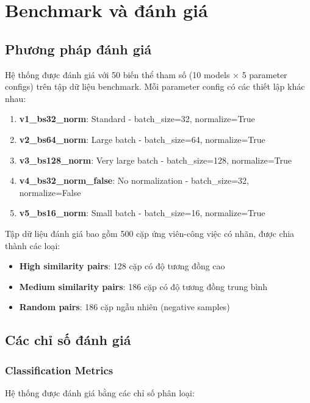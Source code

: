 \section{Benchmark và đánh giá}

\subsection{Phương pháp đánh giá}

Hệ thống được đánh giá với 50 biến thể tham số (10 models × 5 parameter configs) trên tập dữ liệu benchmark. Mỗi parameter config có các thiết lập khác nhau:

\begin{enumerate}
    \item \textbf{v1\_bs32\_norm}: Standard - batch\_size=32, normalize=True
    \item \textbf{v2\_bs64\_norm}: Large batch - batch\_size=64, normalize=True
    \item \textbf{v3\_bs128\_norm}: Very large batch - batch\_size=128, normalize=True
    \item \textbf{v4\_bs32\_norm\_false}: No normalization - batch\_size=32, normalize=False
    \item \textbf{v5\_bs16\_norm}: Small batch - batch\_size=16, normalize=True
\end{enumerate}

Tập dữ liệu đánh giá bao gồm 500 cặp ứng viên-công việc có nhãn, được chia thành các loại:
\begin{itemize}
    \item \textbf{High similarity pairs}: 128 cặp có độ tương đồng cao
    \item \textbf{Medium similarity pairs}: 186 cặp có độ tương đồng trung bình
    \item \textbf{Random pairs}: 186 cặp ngẫu nhiên (negative samples)
\end{itemize}

\subsection{Các chỉ số đánh giá}

\subsubsection{Classification Metrics}

Hệ thống được đánh giá bằng các chỉ số phân loại:

